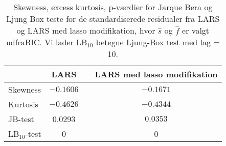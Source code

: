 \begin{table}
\center
\begin{tabular}{lccc} 
\toprule
& LARS && LARS med lasso modifikation \\ \midrule
Skewness & $-0.1606$  && $-0.1671$    \\
Kurtosis &   $-0.4626$ && $-0.4344 $ \\
JB-test & 0.0293 &&  $0.0353$ \\
LB$_{10}$-test & 0 && 0  \\  \bottomrule 
\end{tabular}
\caption{Skewness, excess kurtosis, p-værdier for Jarque Bera og Ljung Box teste for de standardiserede residualer fra LARS og LARS med lasso modifikation, hvor  $\widehat{s}$ og $\widehat{f}$ er valgt udfraBIC. Vi lader LB$_{10}$ betegne Ljung-Box test med lag = 10. } \label{tab:lars_bic_res_tab}
\end{table}